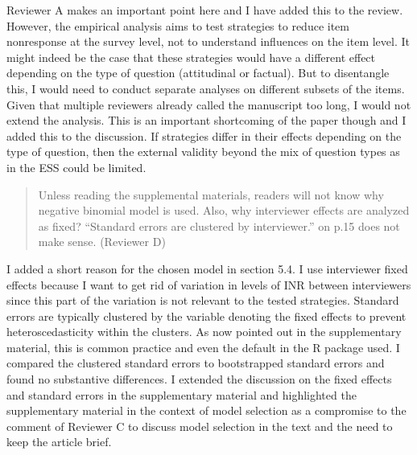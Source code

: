 \documentclass[a4paper, 12pt]{article}
\begin{document}
Reviewer A makes an important point here and I have added this to the review. However, the empirical analysis aims to test strategies to reduce item nonresponse at the survey level, not to understand influences on the item level. It might indeed be the case that these strategies would have a different effect depending on the type of question (attitudinal or factual). But to disentangle this, I would need to conduct separate analyses on different subsets of the items. Given that multiple reviewers already called the manuscript too long, I would not extend the analysis. This is an important shortcoming of the paper though and I added this to the discussion. If strategies differ in their effects depending on the type of question, then the external validity beyond the mix of question types as in the ESS could be limited.

\begin{quotation}
Unless reading the supplemental materials, readers will not know why negative binomial model is used. Also, why interviewer effects are analyzed as fixed? “Standard errors are clustered by interviewer.” on p.15 does not make sense. (Reviewer D)
\end{quotation}

I added a short reason for the chosen model in section 5.4. I use interviewer fixed effects because I want to get rid of variation in levels of INR between interviewers since this part of the variation is not relevant to the tested strategies. Standard errors are typically clustered by the variable denoting the fixed effects to prevent heteroscedasticity within the clusters. As now pointed out in the supplementary material, this is common practice and even the default in the R package used. I compared the clustered standard errors to bootstrapped standard errors and found no substantive differences. I extended the discussion on the fixed effects and standard errors in the supplementary material and highlighted the supplementary material in the context of model selection as a compromise to the comment of Reviewer C to discuss model selection in the text and the need to keep the article brief.
\end{document}
